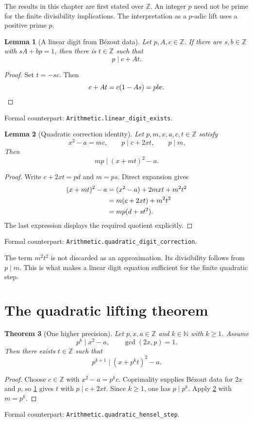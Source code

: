 \documentclass[11pt,letterpaper,oneside,openany]{book}
\theoremstyle{quiet}
\newtheorem{theorem}{Theorem}[chapter]
\newtheorem{lemma}[theorem]{Lemma}
\newcommand{\Z}{\mathbb{Z}}
\newcommand{\N}{\mathbb{N}}
\newcommand{\formal}[1]{\par\nobreak\begingroup\footnotesize\color{Slate}\sffamily Formal counterpart: \normalfont\nolinkurl{#1}.\par\endgroup}
\begin{document}
The results in this chapter are first stated over $\Z$. An integer $p$ need not be prime for the finite divisibility implications. The interpretation as a $p$-adic lift uses a positive prime $p$.

\begin{lemma}[A linear digit from B\'ezout data]\label{lem:digit}
Let $p,A,c\in\Z$. If there are $s,b\in\Z$ with $sA+bp=1$, then there is $t\in\Z$ such that
\[
p\mid c+At.
\]
\end{lemma}
\begin{proof}
Set $t=-sc$. Then
\[
c+At=c(1-As)=pbc.\qedhere
\]
\end{proof}
\formal{Arithmetic.linear_digit_exists}

\begin{lemma}[Quadratic correction identity]\label{lem:quad}
Let $p,m,x,a,c,t\in\Z$ satisfy
\[
x^2-a=mc,\qquad p\mid c+2xt,\qquad p\mid m.
\]
Then
\[
mp\mid (x+mt)^2-a.
\]
\end{lemma}
\begin{proof}
Write $c+2xt=pd$ and $m=ps$. Direct expansion gives
\begin{align*}
(x+mt)^2-a
&=(x^2-a)+2mxt+m^2t^2\\
&=m(c+2xt)+m^2t^2\\
&=mp(d+st^2).\qedhere
\end{align*}
The last expression displays the required quotient explicitly.
\end{proof}
\formal{Arithmetic.quadratic_digit_correction}

The term $m^2t^2$ is not discarded as an approximation. Its divisibility follows from $p\mid m$. This is what makes a linear digit equation sufficient for the finite quadratic step.

\section{The quadratic lifting theorem}
\begin{theorem}[One higher precision]\label{thm:hensel}
Let $p,x,a\in\Z$ and $k\in\N$ with $k\geq1$. Assume
\[
p^k\mid x^2-a,\qquad \gcd(2x,p)=1.
\]
Then there exists $t\in\Z$ such that
\begin{equation}\label{eq:hensel}
p^{k+1}\mid (x+p^kt)^2-a.
\end{equation}
\end{theorem}
\begin{proof}
Choose $c\in\Z$ with $x^2-a=p^kc$. Coprimality supplies B\'ezout data for $2x$ and $p$, so \cref{lem:digit} gives $t$ with $p\mid c+2xt$. Since $k\geq1$, one has $p\mid p^k$. Apply \cref{lem:quad} with $m=p^k$.
\end{proof}
\formal{Arithmetic.quadratic_hensel_step}
\end{document}

